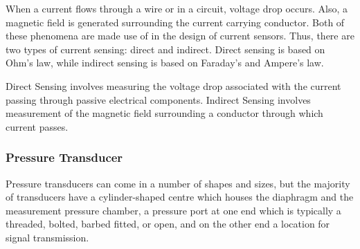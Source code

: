 When a current flows through a wire or in a circuit, voltage drop occurs. Also, a magnetic field is generated surrounding the current carrying conductor. Both of these phenomena are made use of in the design of current sensors. Thus, there are two types of current sensing: direct and indirect. Direct sensing is based on Ohm’s law, while indirect sensing is based on Faraday’s and Ampere’s law.



Direct Sensing involves measuring the voltage drop associated with the current passing through passive electrical components.
Indirect Sensing involves measurement of the magnetic field surrounding a conductor through which current passes.
\subsubsection{Pressure Transducer}
Pressure transducers can come in a number of shapes and sizes, but the majority of transducers have a cylinder-shaped centre which houses the diaphragm and the measurement pressure chamber, a pressure port at one end which is typically a threaded, bolted, barbed fitted, or open, and on the other end a location for signal transmission\cite{noauthor_different_nodate}. 




